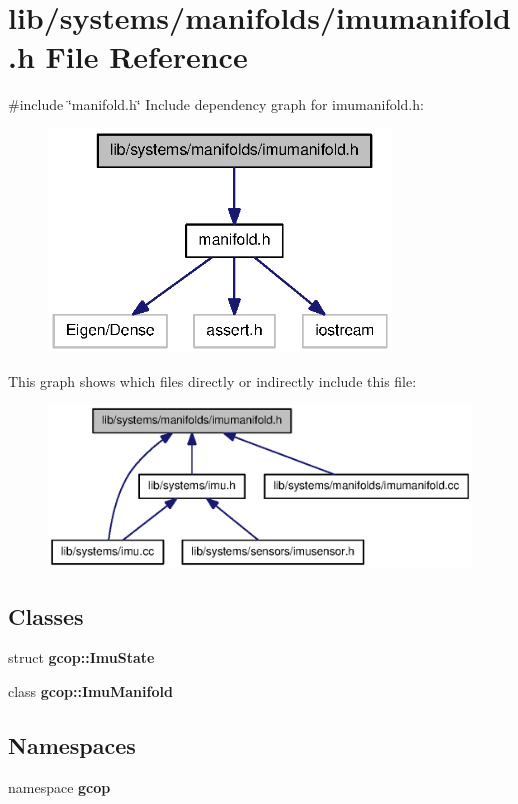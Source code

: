 \section{lib/systems/manifolds/imumanifold.h \-File \-Reference}
\label{imumanifold_8h}
{\ttfamily \#include \char`\"{}manifold.\-h\char`\"{}}\*
\-Include dependency graph for imumanifold.\-h\-:\nopagebreak
\begin{figure}[H]
\begin{center}
\leavevmode
\includegraphics[width=258pt]{imumanifold_8h__incl}
\end{center}
\end{figure}
\-This graph shows which files directly or indirectly include this file\-:\nopagebreak
\begin{figure}[H]
\begin{center}
\leavevmode
\includegraphics[width=350pt]{imumanifold_8h__dep__incl}
\end{center}
\end{figure}
\subsection*{\-Classes}
\begin{DoxyCompactItemize}
\item 
struct {\bf gcop\-::\-Imu\-State}
\item 
class {\bf gcop\-::\-Imu\-Manifold}
\end{DoxyCompactItemize}
\subsection*{\-Namespaces}
\begin{DoxyCompactItemize}
\item 
namespace {\bf gcop}
\end{DoxyCompactItemize}
